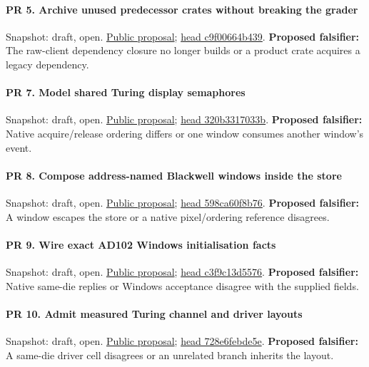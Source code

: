 \paragraph{PR 5. Archive unused predecessor crates without breaking the grader}
\readcode Snapshot: draft, open.
\href{\repobase/pull/5}{Public proposal};
\href{\repobase/commit/c9f00664b439a27b7e52c1157c7262a4c50fa444}{head c9f00664b439}.
\textbf{Proposed falsifier:} The raw-client dependency closure no longer builds or a product crate
  acquires a legacy dependency.

\paragraph{PR 7. Model shared Turing display semaphores}
\readcode Snapshot: draft, open.
\href{\repobase/pull/7}{Public proposal};
\href{\repobase/commit/320b3317033b3755836d59abd69e6b75b2394953}{head 320b3317033b}.
\textbf{Proposed falsifier:} Native acquire/release ordering differs or one window consumes another
  window's event.

\paragraph{PR 8. Compose address-named Blackwell windows inside the store}
\readcode Snapshot: draft, open.
\href{\repobase/pull/8}{Public proposal};
\href{\repobase/commit/598ca60f8b76231e023e2152cc220e07d683c1e3}{head 598ca60f8b76}.
\textbf{Proposed falsifier:} A window escapes the store or a native pixel/ordering reference
  disagrees.

\paragraph{PR 9. Wire exact AD102 Windows initialisation facts}
\readcode Snapshot: draft, open.
\href{\repobase/pull/9}{Public proposal};
\href{\repobase/commit/c3f9c13d557607e40ef95fdaf022268dde875721}{head c3f9c13d5576}.
\textbf{Proposed falsifier:} Native same-die replies or Windows acceptance disagree with the
  supplied fields.

\paragraph{PR 10. Admit measured Turing channel and driver layouts}
\readcode Snapshot: draft, open.
\href{\repobase/pull/10}{Public proposal};
\href{\repobase/commit/728e6febde5e42d53c8085675e2bf1209ab38375}{head 728e6febde5e}.
\textbf{Proposed falsifier:} A same-die driver cell disagrees or an unrelated branch inherits the
  layout.

